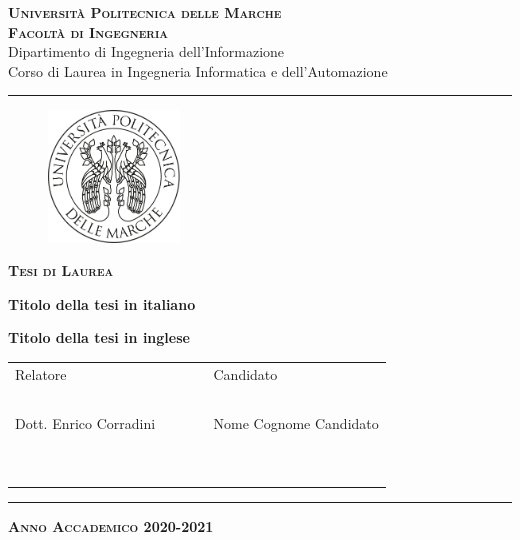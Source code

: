 \begin{titlepage}
\changepage{}{}{}{-7.5 mm}{}{}{}{}{}

\begin{center}
{\LARGE \bf \scshape Universit\`a Politecnica delle Marche}\\
\vspace{0.2cm}
{\Large \bf \scshape Facolt\`a di Ingegneria}\\
\vspace{0.2cm}
{\Large Dipartimento di Ingegneria dell'Informazione}\\
\vspace{0.2cm}
{\large Corso di Laurea in Ingegneria Informatica e dell'Automazione}\\

\rule{150mm}{.2mm}


\vspace{10mm}

\begin{figure}[h!]
	\centering
	\includegraphics[width=3.5cm]{logo.png}
\end{figure}

\vspace{10mm}

\textbf{ \large \scshape Tesi di Laurea}

\vspace{8mm}

\Large{\bf Titolo della tesi in italiano}

\vspace{7mm}

\Large{\bf Titolo della tesi in inglese}

\end{center} 	
\vspace{20mm} 	
\begin{center}
\begin{tabular}{lcl}
	{\large Relatore} & \ \hskip 6cm \ & {\large Candidato} \\
	\ & \ & \\
	{Dott. Enrico Corradini} \ & \ & {Nome Cognome Candidato} \\
	\ & \ & \ \\
	\ & \ & \ \\
	
\end{tabular}

\vspace{12mm}

\rule{150mm}{.2mm}

\textbf{\scshape Anno Accademico 2020-2021}
\end{center} 	
\end{titlepage}

